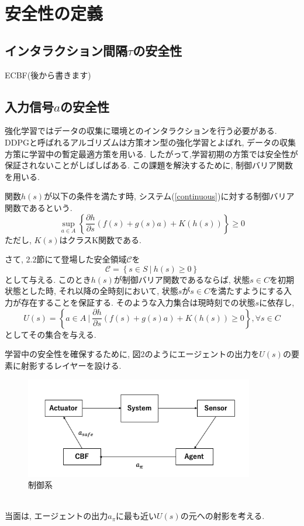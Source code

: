 \documentclass{jsarticle}
\newcommand{\pdif}[2]{\frac{\partial#1}{\partial#2}}
\begin{document}
\section{安全性の定義}
\subsection{インタラクション間隔$\tau$の安全性}
ECBF(後から書きます)


\subsection{入力信号$a$の安全性}
強化学習ではデータの収集に環境とのインタラクションを行う必要がある. DDPGと呼ばれるアルゴリズムは方策オン型の強化学習とよばれ, データの収集方策に学習中の暫定最適方策を用いる. したがって,学習初期の方策では安全性が保証されないことがしばしばある. この課題を解決するために, 制御バリア関数を用いる. \par
関数$h(s)$が以下の条件を満たす時, システム(\ref{continuous})に対する制御バリア関数であるという. 
\begin{equation}
	\sup_{a\in A}\left\{\pdif{h}{s}(f(s)+g(s)a)+K(h(s))\right\} \geq 0 \label{CBF}
\end{equation}
ただし, $K(s)$はクラスK関数である.\par
さて, 2.2節にて登場した安全領域$\mathcal{C}$を
\begin{equation}
	\mathcal{C} = \left\{s \in S~|~h(s)\geq 0\right\}
\end{equation}
として与える. このとき$h(s)$が制御バリア関数であるならば, 状態$s\in C$を初期状態とした時, それ以降の全時刻において, 状態$s$が$s\in C$を満たすようにする入力が存在することを保証する. そのような入力集合は現時刻での状態$s$に依存し,
\begin{equation}
	U(s) = \left\{a \in A~|~\pdif{h}{s}(f(s)+g(s)a)+K(h(s))\geq 0\right\}, \forall s\in C
\end{equation}
としてその集合を与える.\par
学習中の安全性を確保するために, 図2のようにエージェントの出力を$U(s)$の要素に射影するレイヤーを設ける.
\begin{figure}[h]
	\centering
 	\includegraphics[width=10cm]{barrier_certificate.png}
 	\caption{制御系} \label{cbf}
\end{figure}\\
当面は, エージェントの出力$a_{\pi}$に最も近い$U(s)$の元への射影を考える.
\end{document}
